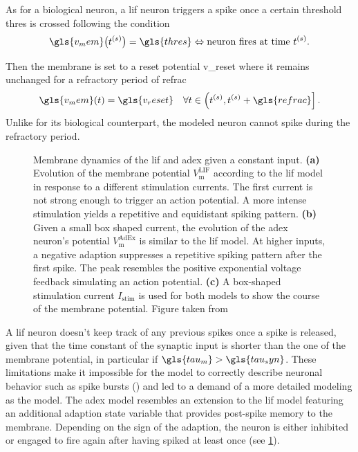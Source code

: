 As for a biological neuron, a \gls{lif} neuron triggers a spike once a certain threshold \gls{thres} is crossed following the condition
\begin{equation*}
\gls{v_mem}\big(t^{(s)}\big) = \gls{thres} \Leftrightarrow \text{neuron fires at time } t^{(s)}.
\end{equation*}

Then the membrane is set to a reset potential \gls{v_reset} where it remains unchanged for a refractory period of \gls{refrac}
\begin{equation*}
\gls{v_mem}(t) = \gls{v_reset} \quad \forall t \in \left(t^{(s)}, t^{(s)} + \gls{refrac}\right].
\end{equation*}
Unlike for its biological counterpart, the modeled neuron cannot spike during the refractory period.

\begin{figure}
	\centering
	\scalebox{0.93}{}
	\caption[Membrane dynamics of the \gls{lif} and \gls{adex} given a constant input.]{Membrane dynamics of the \gls{lif} and \gls{adex} given a constant input. \textbf{(a)} Evolution of the membrane potential $V_\text{m}^\text{LIF}$ according to the \gls{lif} model in response to a different stimulation currents. The first current is not strong enough to trigger an action potential. A more intense stimulation yields a repetitive and equidistant spiking pattern. \textbf{(b)} Given a small box shaped current, the evolution of the \gls{adex} neuron's potential $V_\text{m}^\text{AdEx}$ is similar to the \gls{lif} model. At higher inputs, a negative adaption suppresses a repetitive spiking pattern after the first spike. The peak resembles the positive exponential voltage feedback simulating an action potential. \textbf{(c)} A box-shaped stimulation current $I_\text{stim}$ is used for both models to show the course of the membrane potential. Figure taken from \citealp{stradmann2019msc}}
	\label{lifvsadex}
\end{figure}

A \gls{lif} neuron doesn't keep track of any previous spikes once a spike is released, given that the time constant of the synaptic input is shorter than the one of the membrane potential, in particular if $\gls{tau_m} > \gls{tau_syn}$. These limitations make it impossible for the model to correctly describe neuronal behavior such as spike bursts (\citealp{gerstner2014dynamics}) and led to a demand of a more detailed modeling as the  model. The \gls{adex} model resembles an extension to the \gls{lif} model featuring an additional adaption state variable that provides post-spike memory to the membrane. Depending on the sign of the adaption, the neuron is either inhibited or engaged to fire again after having spiked at least once (see \cref{lifvsadex}).

